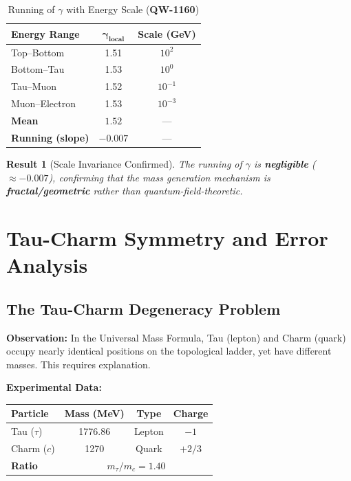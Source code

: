 \documentclass[11pt, a4paper]{article}
\newtheorem{result}{Result}[section]
\theoremstyle{remark}
\newcommand{\QW}[1]{\textbf{QW-#1}}
\begin{document}
\begin{table}[H]
\centering
\caption{Running of $\gamma$ with Energy Scale (\QW{1160})}
\begin{tabular}{|l|c|c|}
\hline
\textbf{Energy Range} & $\mathbf{\gamma_{local}}$ & \textbf{Scale (GeV)} \\
\hline
Top--Bottom & 1.51 & $10^2$ \\
Bottom--Tau & 1.53 & $10^0$ \\
Tau--Muon & 1.52 & $10^{-1}$ \\
Muon--Electron & 1.53 & $10^{-3}$ \\
\hline
\textbf{Mean} & $\mathbf{1.52}$ & --- \\
\textbf{Running (slope)} & $\mathbf{-0.007}$ & --- \\
\hline
\end{tabular}
\end{table}

\begin{result}[Scale Invariance Confirmed]
The running of $\gamma$ is \textbf{negligible} ($\approx -0.007$), confirming that the mass generation mechanism is \textbf{fractal/geometric} rather than quantum-field-theoretic.
\end{result}

\section{Tau-Charm Symmetry and Error Analysis}

\subsection{The Tau-Charm Degeneracy Problem}

\textbf{Observation:} In the Universal Mass Formula, Tau (lepton) and Charm (quark) occupy nearly identical positions on the topological ladder, yet have different masses. This requires explanation.

\textbf{Experimental Data:}
\begin{table}[H]
\centering
\begin{tabular}{|l|c|c|c|}
\hline
\textbf{Particle} & \textbf{Mass (MeV)} & \textbf{Type} & \textbf{Charge} \\
\hline
Tau ($\tau$) & 1776.86 & Lepton & $-1$ \\
Charm ($c$) & 1270 & Quark & $+2/3$ \\
\hline
\textbf{Ratio} & \multicolumn{3}{c|}{$m_\tau/m_c = 1.40$} \\
\hline
\end{tabular}
\end{table}
\end{document}
